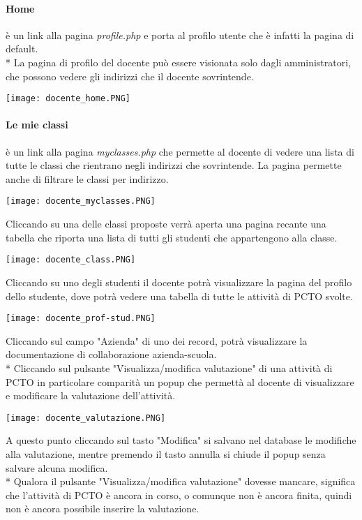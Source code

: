 \documentclass[12pt]{article}
\begin{document}
\paragraph{Home} è un link alla pagina \textit{profile.php} e porta al profilo utente che è infatti la pagina di default.\\*
La pagina di profilo del docente può essere visionata solo dagli amministratori, che possono vedere gli indirizzi che il docente sovrintende.
\begin{center}
    \texttt{[image: docente\_home.PNG]}
\end{center}

\paragraph{Le mie classi} è un link alla pagina \textit{myclasses.php} che permette al docente di vedere una lista di tutte le classi che rientrano negli indirizzi che sovrintende. La pagina permette anche di filtrare le classi per indirizzo.

\begin{center}
    \texttt{[image: docente\_myclasses.PNG]}
\end{center}

\noindent
Cliccando su una delle classi proposte verrà aperta una pagina recante una tabella che riporta una lista di tutti gli studenti che appartengono alla classe. \begin{center}
    \texttt{[image: docente\_class.PNG]}
\end{center}

Cliccando su uno degli studenti il docente potrà visualizzare la pagina del profilo dello studente, dove potrà vedere una tabella di tutte le attività di PCTO svolte. 
\begin{center}
    \texttt{[image: docente\_prof-stud.PNG]}
\end{center}
Cliccando sul campo "Azienda" di uno dei record, potrà visualizzare la documentazione di collaborazione azienda-scuola.\\*
Cliccando sul pulsante "Visualizza/modifica valutazione" di una attività di PCTO in particolare comparità un popup che permettà al docente di visualizzare e modificare la valutazione dell'attività. 
\begin{center}
    \texttt{[image: docente\_valutazione.PNG]} 
\end{center}
A questo punto cliccando sul tasto "Modifica" si salvano nel database le modifiche alla valutazione, mentre premendo il tasto annulla si chiude il popup senza salvare alcuna modifica.\\*
Qualora il pulsante "Visualizza/modifica valutazione" dovesse mancare, significa che l'attività di PCTO è ancora in corso, o comunque non è ancora finita, quindi non è ancora possibile inserire la valutazione.
\newpage
\end{document}
